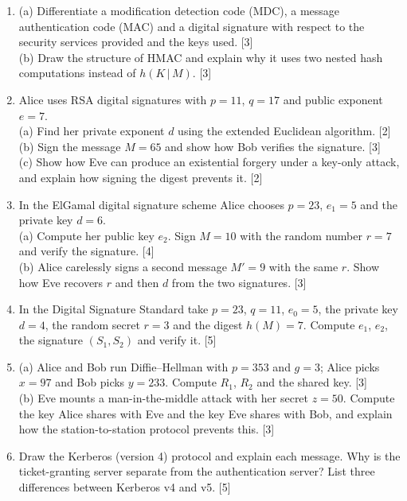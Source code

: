 \begin{enumerate}[leftmargin=2em,itemsep=6pt,label=\textbf{Q\arabic*.}]
\item (a) Differentiate a modification detection code (MDC), a message authentication code (MAC) and a digital signature with respect to the security services provided and the keys used. \hfill [3]\\
(b) Draw the structure of HMAC and explain why it uses two nested hash computations instead of $h(K \,|\, M)$. \hfill [3]

\item Alice uses RSA digital signatures with $p = 11$, $q = 17$ and public exponent $e = 7$.\\
(a) Find her private exponent $d$ using the extended Euclidean algorithm. \hfill [2]\\
(b) Sign the message $M = 65$ and show how Bob verifies the signature. \hfill [3]\\
(c) Show how Eve can produce an existential forgery under a key-only attack, and explain how signing the digest prevents it. \hfill [2]

\item In the ElGamal digital signature scheme Alice chooses $p = 23$, $e_1 = 5$ and the private key $d = 6$.\\
(a) Compute her public key $e_2$. Sign $M = 10$ with the random number $r = 7$ and verify the signature. \hfill [4]\\
(b) Alice carelessly signs a second message $M' = 9$ with the same $r$. Show how Eve recovers $r$ and then $d$ from the two signatures. \hfill [3]

\item In the Digital Signature Standard take $p = 23$, $q = 11$, $e_0 = 5$, the private key $d = 4$, the random secret $r = 3$ and the digest $h(M) = 7$. Compute $e_1$, $e_2$, the signature $(S_1, S_2)$ and verify it. \hfill [5]

\item (a) Alice and Bob run Diffie--Hellman with $p = 353$ and $g = 3$; Alice picks $x = 97$ and Bob picks $y = 233$. Compute $R_1$, $R_2$ and the shared key. \hfill [3]\\
(b) Eve mounts a man-in-the-middle attack with her secret $z = 50$. Compute the key Alice shares with Eve and the key Eve shares with Bob, and explain how the station-to-station protocol prevents this. \hfill [3]

\item Draw the Kerberos (version 4) protocol and explain each message. Why is the ticket-granting server separate from the authentication server? List three differences between Kerberos v4 and v5. \hfill [5]


\end{enumerate}
